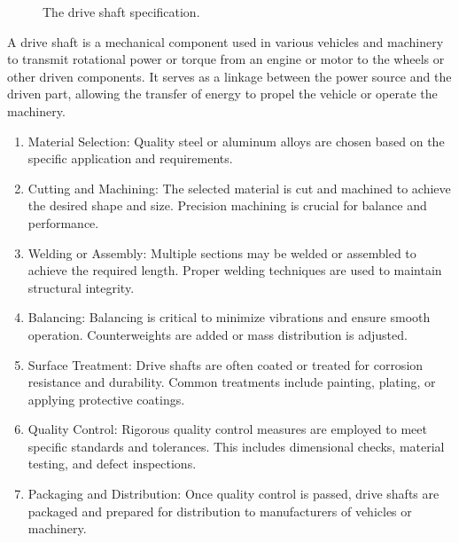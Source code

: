 \documentclass[
  a4paper,
]{scrbook}
\begin{document}
\begin{figure}[ht]


\caption{\label{fig-drive-shaft-spec}The drive shaft specification.}

\end{figure}%

A drive shaft is a mechanical component used in various vehicles and
machinery to transmit rotational power or torque from an engine or motor
to the wheels or other driven components. It serves as a linkage between
the power source and the driven part, allowing the transfer of energy to
propel the vehicle or operate the machinery.

\begin{enumerate}
\def\labelenumi{\arabic{enumi}.}
\item
  Material Selection: Quality steel or aluminum alloys are chosen based
  on the specific application and requirements.
\item
  Cutting and Machining: The selected material is cut and machined to
  achieve the desired shape and size. Precision machining is crucial for
  balance and performance.
\item
  Welding or Assembly: Multiple sections may be welded or assembled to
  achieve the required length. Proper welding techniques are used to
  maintain structural integrity.
\item
  Balancing: Balancing is critical to minimize vibrations and ensure
  smooth operation. Counterweights are added or mass distribution is
  adjusted.
\item
  Surface Treatment: Drive shafts are often coated or treated for
  corrosion resistance and durability. Common treatments include
  painting, plating, or applying protective coatings.
\item
  Quality Control: Rigorous quality control measures are employed to
  meet specific standards and tolerances. This includes dimensional
  checks, material testing, and defect inspections.
\item
  Packaging and Distribution: Once quality control is passed, drive
  shafts are packaged and prepared for distribution to manufacturers of
  vehicles or machinery.
\end{enumerate}
\end{document}
